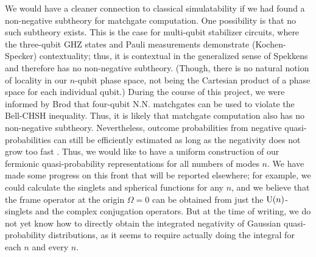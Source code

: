 We would have a cleaner connection to classical simulatability if we had found a non-negative subtheory for matchgate computation. One possibility is that no such subtheory exists. This is the case for multi-qubit stabilizer circuits, where the three-qubit GHZ states and Pauli measurements demonstrate (Kochen-Specker) contextuality; thus, it is contextual in the generalized sense of Spekkens \cite{spekkens_negativity_2008} and therefore has no non-negative subtheory. (Though, there is no natural notion of locality in our $n$-qubit phase space, not being the Cartesian product of a phase space for each individual qubit.) During the course of this project, we were informed by Brod \cite{brod-CHSH} that four-qubit N.N. matchgates can be used to violate the Bell-CHSH inequality. Thus, it is likely that matchgate computation also has no non-negative subtheory. %
Nevertheless, outcome probabilities from negative quasi-probabilities can still be efficiently estimated as long as the negativity does not grow too fast \cite{pashayan_estimating_2015}. Thus, we would like to have a uniform construction of our fermionic quasi-probability representations for all numbers of modes $n$. We have made some progress on this front that will be reported elsewhere; for example, we could calculate the singlets and spherical functions for any $n$, and we believe that the frame operator at the origin $\Omega=0$ can be obtained from just the $\text{U}(n)$-singlets and the complex conjugation operators. But at the time of writing, we do not yet know how to directly obtain the integrated negativity of Gaussian quasi-probability distributions, as it seems to require actually doing the integral for each $n$ and every $n$. %

